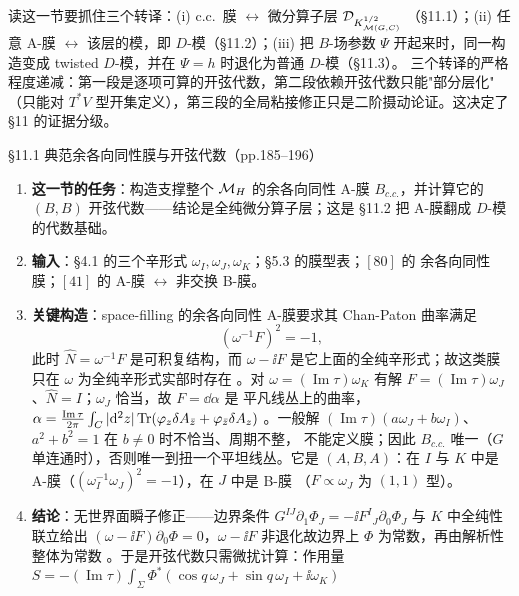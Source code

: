 读这一节要抓住三个转译：(i) c.c.\ 膜 $\leftrightarrow$ 微分算子层 $\mathcal{D}_{K_{\mathcal{M}(G,C)}^{1/2}}$
（\S11.1）；(ii) 任意 A-膜 $\leftrightarrow$ 该层的模，即 $D$-模（\S11.2）；(iii) 把 $B$-场参数
$\Psi$ 开起来时，同一构造变成 twisted $D$-模，并在 $\Psi=h$ 时退化为普通 $D$-模（\S11.3）。
三个转译的严格程度递减：第一段是逐项可算的开弦代数，第二段依赖开弦代数只能"部分层化"
（只能对 $T^*V$ 型开集定义），第三段的全局粘接修正只是二阶摄动论证。这决定了 \S11 的证据分级。

\begin{kcard}{\S11.1 典范余各向同性膜与开弦代数（pp.185--196）}
\begin{enumerate}[label=\textbf{\arabic*}]
\item \textbf{这一节的任务}：构造支撑整个 $\mathcal{M}_H$ 的余各向同性 A-膜 $B_{c.c.}$，并计算它的
  $(B,B)$ 开弦代数——结论是全纯微分算子层；这是 \S11.2 把 A-膜翻成 $D$-模的代数基础。
\item \textbf{输入}：\S4.1 的三个辛形式 $\omega_I,\omega_J,\omega_K$；\S5.3 的膜型表；$[80]$ 的
  余各向同性膜；$[41]$ 的 A-膜 $\leftrightarrow$ 非交换 B-膜。
\item \textbf{关键构造}：space-filling 的余各向同性 A-膜要求其 Chan-Paton 曲率满足
\begin{equation}
(\omega^{-1}F)^2=-1 ,
\label{eq:geom-cc-condition}
\end{equation}
  此时 $\widehat N=\omega^{-1}F$ 是可积复结构，而 $\omega-\ii F$ 是它上面的全纯辛形式；故这类膜只在
  $\omega$ 为全纯辛形式实部时存在 \pA{}。对 $\omega=(\operatorname{Im}\tau)\omega_K$
  有解 $F=(\operatorname{Im}\tau)\omega_J$、$\widehat N=I$；$\omega_J$ 恰当，故 $F=\dd\alpha$ 是
  平凡线丛上的曲率，$\alpha=\frac{\operatorname{Im}\tau}{2\pi}\int_C|\mathrm{d}^2z|
  \operatorname{Tr}(\varphi_z\delta A_{\bar z}+\varphi_{\bar z}\delta A_z)$ \pA{}。一般解
  $(\operatorname{Im}\tau)(a\omega_J+b\omega_I)$、$a^2+b^2=1$ 在 $b\neq0$ 时不恰当、周期不整，
  不能定义膜；因此 $B_{c.c.}$ 唯一（$G$ 单连通时），否则唯一到扭一个平坦线丛。它是
  $(A,B,A)$：在 $I$ 与 $K$ 中是 A-膜（$(\omega_I^{-1}\omega_J)^2=-1$），在 $J$ 中是 B-膜
  （$F\propto\omega_J$ 为 $(1,1)$ 型）\pA{}。
\item \textbf{结论}：无世界面瞬子修正——边界条件
  $G^{IJ}\partial_1\Phi_J=-\ii F^I{}_J\partial_0\Phi_J$ 与 $K$ 中全纯性联立给出
  $(\omega-\ii F)\partial_0\Phi=0$，$\omega-\ii F$ 非退化故边界上 $\Phi$ 为常数，再由解析性
  整体为常数 \pA{}。于是开弦代数只需微扰计算：作用量
  $S=-(\operatorname{Im}\tau)\int_\Sigma\Phi^*(\cos q\,\omega_J+\sin q\,\omega_I+\ii\omega_K)$

\end{enumerate}
\end{kcard}
